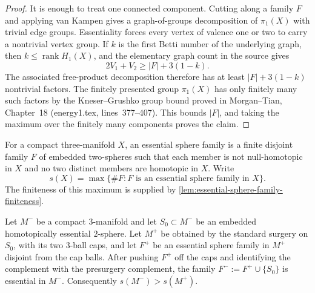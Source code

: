 \begin{proof}
It is enough to treat one connected component.  Cutting along a family
$F$ and applying van Kampen gives a graph-of-groups decomposition of
$\pi_1(X)$ with trivial edge groups.  Essentiality forces every vertex of
valence one or two to carry a nontrivial vertex group.  If $k$ is the first
Betti number of the underlying graph, then $k\le\operatorname{rank}H_1(X)$,
and the elementary graph count in the source gives
\[
 2V_1+V_2\ge |F|+3(1-k).
\]
The associated free-product decomposition therefore has at least
$|F|+3(1-k)$ nontrivial factors.  The finitely presented group
$\pi_1(X)$ has only finitely many such factors by the
Kneser--Grushko group bound proved in Morgan--Tian, Chapter~18
(energy1.tex, lines~377--407).  This bounds $|F|$, and taking the
maximum over the finitely many components proves the claim.
\end{proof}

\begin{definition}
\label{def:essential-sphere-family-complexity}
\notready
For a compact three-manifold $X$, an essential sphere family is a finite
disjoint family $F$ of embedded two-spheres such that each member is not
null-homotopic in $X$ and no two distinct members are homotopic in $X$.
Write
\[
 s(X)=\max\{\#F:F\text{ is an essential sphere family in }X\}.
\]
The finiteness of this maximum is supplied by
\ref{lem:essential-sphere-family-finiteness}.
\end{definition}

\begin{lemma}
\label{lem:essential-family-survives-essential-surgery}
\notready
Let $M^-$ be a compact $3$-manifold and let $S_0\subset M^-$ be an embedded
homotopically essential $2$-sphere.  Let $M^+$ be obtained by the standard
surgery on $S_0$, with its two $3$-ball caps, and let
$F^+$ be an essential sphere family in $M^+$ disjoint from the cap balls.
After pushing $F^+$ off the caps and identifying the complement with the
presurgery complement, the family
$F^-:=F^+\cup\{S_0\}$ is essential in $M^-$.
Consequently $s(M^-)>s(M^+)$.
\end{lemma}

